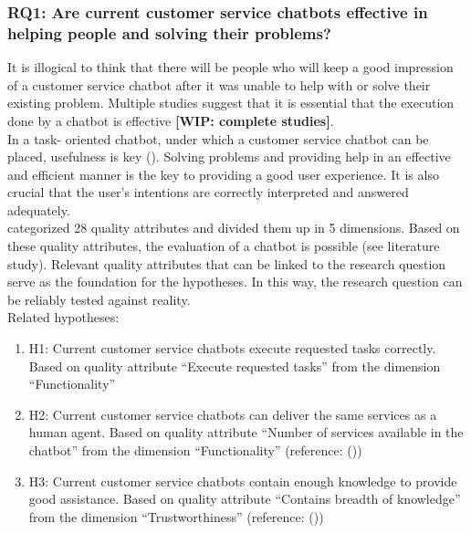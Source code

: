 \subsubsection{RQ1: Are current customer service chatbots effective in helping people and solving their problems?}
It is illogical to think that there will be people who will keep a good impression of a customer service chatbot after it was unable to help with or solve their existing problem. Multiple studies suggest that it is essential that the execution done by a chatbot is effective \textbf{[WIP: complete studies]}.\\
In a task- oriented chatbot, under which a customer service chatbot can be placed, usefulness is key (\cite{brandtzaeg2020}). Solving problems and providing help in an effective and efficient manner is the key to providing a good user experience. It is also crucial that the user's intentions are correctly interpreted and answered adequately.\\
\break
\cite{Verkeyn2018} categorized 28 quality attributes and divided them up in 5 dimensions. Based on these quality attributes, the evaluation of a chatbot is possible (see literature study). Relevant quality attributes that can be linked to the research question serve as the foundation for the hypotheses. In this way, the research question can be reliably tested against reality.\\
\break
\break
Related hypotheses:
\begin{enumerate}
	\item H1: Current customer service chatbots execute requested tasks correctly. Based on \cite{Verkeyn2018} quality attribute “Execute requested tasks” from the dimension “Functionality”
	\item H2: Current customer service chatbots can deliver the same services as a human agent. Based on \cite{Verkeyn2018} quality attribute “Number of services available in the chatbot” from the dimension “Functionality” (reference: (\cite{Eeuwen2017}))
	\item H3: Current customer service chatbots contain enough knowledge to provide good assistance. Based on \cite{Verkeyn2018} quality attribute “Contains breadth of knowledge” from the dimension “Trustworthiness” (reference: (\cite{Cohen2016, Kuligowska2015}))
\end{enumerate}

